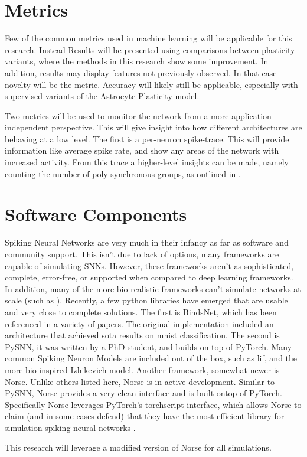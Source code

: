     \section{Metrics} \label{section:metrics}
    Few of the common metrics used in machine learning will be applicable for
    this research. Instead Results will be presented using comparisons between
    plasticity variants, where the methods in this research show some
    improvement. In addition, results may display features not previously
    observed. In that case novelty will be the metric. Accuracy will likely
    still be applicable, especially with supervised variants of the Astrocyte
    Plasticity model.
    
    Two metrics will be used to monitor the network from a more
    application-independent perspective. This will give insight into how
    different architectures are behaving at a low level. The first is a
    per-neuron spike-trace. This will provide information like average spike
    rate, and show any areas of the network with increased activity. From this
    trace a higher-level insights can be made, namely counting the number of
    poly-synchronous groups, as outlined in \cite{sgnn_transistor}.
    
    \section{Software Components}
    Spiking Neural Networks are very much in their infancy as far as software
    and community support. This isn't due to lack of options, many frameworks
    are capable of simulating SNNs. However, these frameworks aren't as
    sophisticated, complete, error-free, or supported when compared to deep
    learning frameworks. In addition, many of the more bio-realistic 
    frameworks can't simulate networks at scale (such as \cite{nest}). Recently, a few
    python libraries have emerged that are usable and very close to complete
    solutions. The first is BindsNet, which has been referenced in a variety of
    papers. The original implementation included an architecture that achieved
    \acrshort{sota} results on \gls{mnist} classification. The second is PySNN, it was written by
    a PhD student, and builds on-top of PyTorch. Many common Spiking Neuron
    Models are included out of the box, such as \gls{lif}, and the more bio-inspired
    Izhikevich model. Another framework, somewhat newer is Norse. Unlike others
    listed here, Norse is in active development. Similar to PySNN, Norse
    provides a very clean interface and is built ontop of PyTorch. Specifically
    Norse leverages PyTorch's torchscript interface, which allows Norse to claim
    (and in some cases defend) that they have the most efficient library for
    simulation spiking neural networks \parencite{norse2021}.

    This research will leverage a modified version of Norse for all simulations.
    
